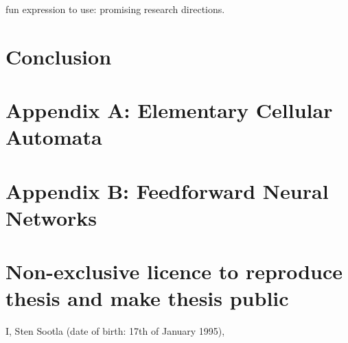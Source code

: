 \documentclass[12pt]{article}
\begin{document}
fun expression to use: promising research directions.

\newpage
\section*{Conclusion}


\newpage



\newpage
\section*{Appendix A: Elementary Cellular Automata}

\newpage
\section*{Appendix B: Feedforward Neural Networks}


\appendix
\pagebreak
\section*{\small Non-exclusive licence to reproduce thesis and make thesis public}


I, Sten Sootla (date of birth: 17th of January 1995),
\end{document}
